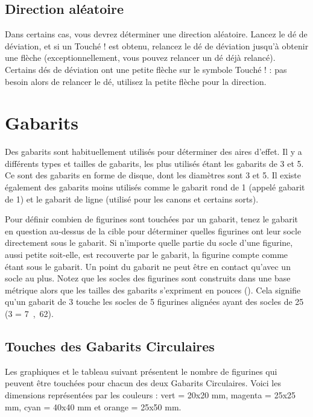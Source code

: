 \subsection{Direction aléatoire}

Dans certains cas, vous devrez déterminer une direction aléatoire. Lancez le dé de déviation, et si un \og Touché ! \fg{} est obtenu, relancez le dé de déviation jusqu'à obtenir une flèche (exceptionnellement, vous pouvez relancer un dé déjà relancé). Certains dés de déviation ont une petite flèche sur le symbole \og Touché ! \fg{} : pas besoin alors de relancer le dé, utilisez la petite flèche pour la direction.

\section{Gabarits}

Des gabarits sont habituellement utilisés pour déterminer des aires d'effet. Il y a différents types et tailles de gabarits, les plus utilisés étant les gabarits de \unit{3}{\pouce} et \unit{5}{\pouce}. Ce sont des gabarits en forme de disque, dont les diamètres sont \unit{3}{\pouce} et \unit{5}{\pouce}. Il existe également des gabarits moins utilisés comme le gabarit rond de \unit{1}{\pouce} (appelé gabarit de \unit{1}{\pouce}) et le gabarit de ligne (utilisé pour les canons et certains sorts).

Pour définir combien de figurines sont touchées par un gabarit, tenez le gabarit en question au-dessus de la cible pour déterminer quelles figurines ont leur socle directement sous le gabarit. Si n'importe quelle partie du socle d'une figurine, aussi petite soit-elle, est recouverte par le gabarit, la figurine compte comme étant sous le gabarit. Un point du gabarit ne peut être en contact qu'avec un socle au plus. Notez que les socles des figurines sont construits dans une base métrique alors que les tailles des gabarits s'expriment en pouces (\pouce). Cela signifie qu'un gabarit de \unit{3}{\pouce} touche les socles de 5 figurines alignées ayant des socles de \unit{25}{\milli\meter}  (\unit{3}{\pouce} = \unit{7,62}{\centi\meter}).

\subsection{Touches des Gabarits Circulaires}

Les graphiques et le tableau suivant présentent le nombre de figurines qui peuvent être touchées pour chacun des deux Gabarits Circulaires. Voici les dimensions représentées par les couleurs : vert = 20x20 mm, magenta = 25x25 mm, cyan = 40x40 mm et orange = 25x50 mm.

